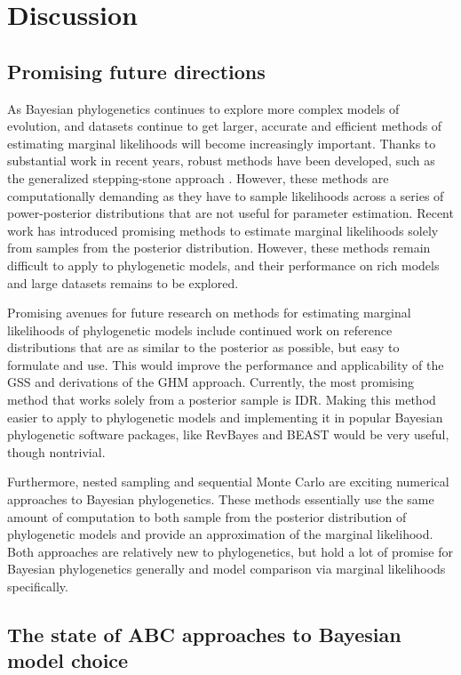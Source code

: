 \section{Discussion}

\subsection{Promising future directions}

As Bayesian phylogenetics continues to explore more complex models of
evolution, and datasets continue to get larger, accurate and efficient methods
of estimating marginal likelihoods will become increasingly important.
Thanks to substantial work in recent years, robust methods have been developed,
such as the generalized stepping-stone approach \citep{Fan2011}.
However, these methods are computationally demanding as they have to sample
likelihoods across a series of power-posterior distributions that are not
useful for parameter estimation.
Recent work has introduced promising methods to estimate marginal likelihoods
solely from samples from the posterior distribution.
However, these methods remain difficult to apply to phylogenetic models, and
their performance on rich models and large datasets remains to be explored.

Promising avenues for future research on methods for estimating marginal
likelihoods of phylogenetic models include continued work on reference
distributions that are as similar to the posterior as possible, but easy to
formulate and use.
This would improve the performance and applicability of the GSS and derivations
of the GHM approach.
Currently, the most promising method that works solely from a posterior
sample is IDR.
Making this method easier to apply to phylogenetic models and implementing
it in popular Bayesian phylogenetic software packages,
like
RevBayes \citep{Hohna2016}
and
BEAST \citep{Drummond2012,Bouckaert2014}
would be very useful, though nontrivial.

Furthermore, nested sampling and sequential Monte Carlo are exciting numerical
approaches to Bayesian phylogenetics.
These methods essentially use the same amount of computation to both sample
from the posterior distribution of phylogenetic models and provide an
approximation of the marginal likelihood.
Both approaches are relatively new to phylogenetics, but hold a lot of promise
for Bayesian phylogenetics generally and model comparison via marginal
likelihoods specifically.


\subsection{The state of ABC approaches to Bayesian model choice}

